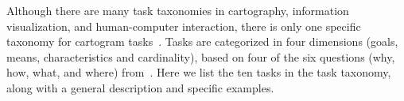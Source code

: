 \documentclass{egpubl}
\begin{document}
Although there are many task taxonomies in cartography, information visualization, and human-computer interaction, there is only one specific taxonomy for cartogram tasks~\cite{Task_C}.
Tasks are categorized in four dimensions (goals, means, characteristics and cardinality), based on four of the six questions (why, how, what, and where) from~\cite{HTMH13}.
Here we list the ten tasks in the task taxonomy, along with a general description and specific examples.


\begin{comment}
The list of tasks with examples taken from cartograms are given below
\begin{itemize}
\item Detect change
\item Locate
\item Recognize
\item Identify
\item Compare
\item Find extremum
\item Filter
\item Find adjacency
\item Sort/Rank
\item Cluster
\item Summarize
\end{itemize}
\end{comment}
\end{document}
